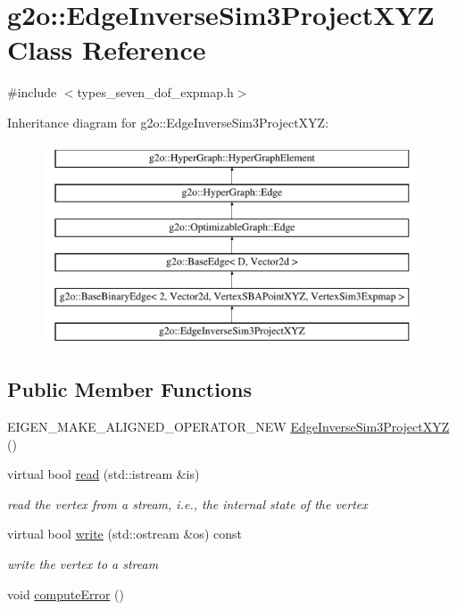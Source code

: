 \hypertarget{classg2o_1_1_edge_inverse_sim3_project_x_y_z}{}\section{g2o\+:\+:Edge\+Inverse\+Sim3\+Project\+X\+YZ Class Reference}
\label{classg2o_1_1_edge_inverse_sim3_project_x_y_z}


{\ttfamily \#include $<$types\+\_\+seven\+\_\+dof\+\_\+expmap.\+h$>$}

Inheritance diagram for g2o\+:\+:Edge\+Inverse\+Sim3\+Project\+X\+YZ\+:\begin{figure}[H]
\begin{center}
\leavevmode
\includegraphics[height=6.000000cm]{classg2o_1_1_edge_inverse_sim3_project_x_y_z}
\end{center}
\end{figure}
\subsection*{Public Member Functions}
\begin{DoxyCompactItemize}
\item 
E\+I\+G\+E\+N\+\_\+\+M\+A\+K\+E\+\_\+\+A\+L\+I\+G\+N\+E\+D\+\_\+\+O\+P\+E\+R\+A\+T\+O\+R\+\_\+\+N\+EW \mbox{\hyperlink{classg2o_1_1_edge_inverse_sim3_project_x_y_z_af4e344ee9f610b41eea60b5914a776bd}{Edge\+Inverse\+Sim3\+Project\+X\+YZ}} ()
\item 
virtual bool \mbox{\hyperlink{classg2o_1_1_edge_inverse_sim3_project_x_y_z_ac229f31599a4f08eebe8f9b239d883f6}{read}} (std\+::istream \&is)
\begin{DoxyCompactList}\small\item\em read the vertex from a stream, i.\+e., the internal state of the vertex \end{DoxyCompactList}\item 
virtual bool \mbox{\hyperlink{classg2o_1_1_edge_inverse_sim3_project_x_y_z_a71ce5fa6b21a59c0cfffdc2b7e8a2024}{write}} (std\+::ostream \&os) const
\begin{DoxyCompactList}\small\item\em write the vertex to a stream \end{DoxyCompactList}\item 
void \mbox{\hyperlink{classg2o_1_1_edge_inverse_sim3_project_x_y_z_a8fa376524e861ae8c4f1a360d217f02d}{compute\+Error}} ()
\end{DoxyCompactItemize}
